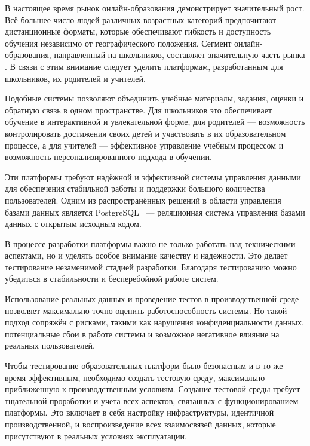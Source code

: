 \introduction %

В настоящее время рынок онлайн-образования демонстрирует значительный рост. Всё большее число людей различных возрастных категорий предпочитают дистанционные форматы, которые обеспечивают гибкость и доступность обучения независимо от географического положения. Сегмент онлайн-образования, направленный на школьников, составляет значительную часть рынка \cite{online-edu-research}. В связи с этим внимание следует уделить платформам, разработанным для школьников, их родителей и учителей.

Подобные системы позволяют объединить учебные материалы, задания, оценки и обратную связь в одном пространстве. Для школьников это обеспечивает обучение в интерактивной и увлекательной форме, для родителей — возможность контролировать достижения своих детей и участвовать в их образовательном процессе, а для учителей — эффективное управление учебным процессом и возможность персонализированного подхода в обучении.

Эти платформы требуют надёжной и эффективной системы управления данными для обеспечения стабильной работы и поддержки большого количества пользователей. Одним из распространённых решений в области управления базами данных является PostgreSQL~\cite{postgresql} — реляционная система управления базами данных с открытым исходным кодом.

В процессе разработки платформы важно не только работать над техническими аспектами, но и уделять особое внимание качеству и надежности. Это делает тестирование незаменимой стадией разработки. Благодаря тестированию можно убедиться в стабильности и бесперебойной работе систем.

Использование реальных данных и проведение тестов в производственной среде позволяет максимально точно оценить работоспособность системы. Но такой подход сопряжён с рисками, такими как нарушения конфиденциальности данных, потенциальные сбои в работе системы и возможное негативное влияние на реальных пользователей.

Чтобы тестирование образовательных платформ было безопасным и в то же время эффективным, необходимо создать тестовую среду, максимально приближенную к производственным условиям. Создание тестовой среды требует тщательной проработки и учета всех аспектов, связанных с функционированием платформы. Это включает в себя настройку инфраструктуры, идентичной производственной, и воспроизведение всех взаимосвязей данных, которые присутствуют в реальных условиях эксплуатации.

